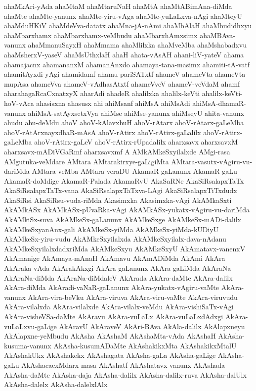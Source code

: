 {ahaMkAri-yAda
ahaMtaM
ahaMtaruNaH
ahaMtA
ahaMtABimAna-diMda
ahaMte
ahaMte-yanunx
ahaMte-yiru-vAga
ahaMte-yuLaLxva-nAgi
ahaMteyU
ahaMduHKiV
ahaMdeVva-datatx
ahaMna-jA-nAmi
ahaMbAlaH
ahaMbudidhxyu
ahaMbarxhamx
ahaMbarxhamx-veMbudu
ahaMbarxhAmxsimx
ahaMBAva-vanunx
ahaMmanuSayxH
ahaMmama
ahaMlilxka
ahaMveMba
ahaMshabadxvu
ahaMsherxV-yaseV
ahaMsUthxlaH
ahaH
ahata-vAsAH
ahani-liV-yateV
ahama
ahamajacnx
ahamananxM
ahamanAnxdo
ahamaya-tana-masimx
ahamiti-tA-vatf
ahamitAyxdi-yAgi
ahamidamf
ahamu-pariSATxtf
ahameV
ahameVta
ahameVta-mupAsa
ahameVva
ahameV-vAdhasAtxtf
ahameVveV
ahameV-veVdaM
ahamf
aharahagaRcaCxnatxyX
aharAdi
ahadeR
ahalilxka
ahalilx-keVti
ahalilx-keVti-hoV-vAca
ahasisxna
ahasusx
ahi
ahiMsanf
ahiMsA
ahiMsAdi
ahiMsA-dhamaR-vanunx
ahiMsA-satAyxsetxVya
ahiMse
ahiMse-yanunx
ahiMseyU
ahita-vanunx
ahudu
ahu-deMdu
ahoV
ahoV-kAlavxhuH
ahoV-rAtarx
ahoV-rAtarx-gaLeMba
ahoV-rAtArxnayxdhaR-mAsA
ahoV-rAtirx
ahoV-rAtirx-gaLalilx
ahoV-rAtirx-gaLeMba
ahoV-rAtirx-gaLeV
ahoV-rAtirx-rUpadalilx
aharxsavx
aharxsavxM
aharxsavx-mADiVGaRmf
aharxsavxmf
A
AMkAMkeSxyilalxde
AMgi-rasa
AMgutuka-veMdare
AMtara
AMtarakirxye-gaLigiMta
AMtara-vasutx-vAgiru-vu-dariMda
AMtara-veMba
AMtara-veraDU
AkamaR-gaLanunx
AkamaR-gaLu
AkamaR-doMdige
AkamaR-Palada
AkamaRvU
AkaSaRNe
AkaSiRsalapxTaTx
AkaSiRsalapxTaTx-vana
AkaSiRsalapxTaTxva-LAgi
AkaSiRsalapxTiTxdudx
AkaSiRsi
AkaSiRsu-vuda-riMda
Akasimxka
Akasimxka-vAgi
AkAMkaSxti
AkAMkASx
AkAMkASx-pUvaRka-vAgi
AkAMkASx-yukatx-vAgiru-vu-dariMda
AkAMkiSx-suva
AkAMkeSx-gaLanunx
AkAMkeSxge
AkAMkeSx-mADi-dalilx
AkAMkeSxyanAnx-gali
AkAMkeSx-yiMda
AkAMkeSx-yiMda-kUDiyU
AkAMkeSx-yiru-vudu
AkAMkeSxyilalxda
AkAMkeSxyilalx-dava-nAdanu
AkAMkeSxyilalxdadxriMda
AkAMkeSxyu
AkAMkeSxyU
AkAmatavx-vanenxV
AkAmanige
AkAmaya-mAnaH
AkAmavu
AkAmADiMda
AkAmi
AkAra
AkAraka-vAda
AkArakAkxgi
AkAra-gaLanunx
AkAra-gaLiMda
AkAraNa
AkAraNa-diMda
AkAraNa-diMdaleV
AkArada
AkAra-daMte
AkAra-dalilx
AkAra-diMda
AkAradi-vaNaR-gaLanunx
AkAra-yukatx-vAgiru-vaMte
AkAra-vanunx
AkAra-vira-beVku
AkAra-viruva
AkAra-viru-vaMte
AkAra-viruvudu
AkAra-vilalxda
AkAra-vilalxde
AkAra-vilalx-veMdu
AkAra-vishiSaTx-vAgi
AkAra-visheVSa-daMte
AkAravu
AkAra-vuLaLx
AkAra-vuLaLxdAdxgi
AkAra-vuLaLxvu-gaLige
AkAravU
AkAraveV
AkAri-BAva
AkAla-dalilx
AkAlapxneyu
AkAlapxne-yeMbudu
AkAsha
AkAshaM
AkAshaMta-vAda
AkAshaH
AkAsha-kusuma-vanunx
AkAsha-kusumADaMte
AkAshakikxMta
AkAshakikxMtalU
AkAshakUkx
AkAshakekx
AkAshagata
AkAsha-gaLa
AkAsha-gaLige
AkAsha-gaLu
AkAshacacxMdarx-masa
AkAshatf
AkAshatavx-vanunx
AkAshada
AkAsha-daMte
AkAsha-daja
AkAsha-dalilx
AkAsha-dalilx-ruva
AkAsha-dalUlx
AkAsha-dalelx
AkAsha-dalelxlAlx
}
